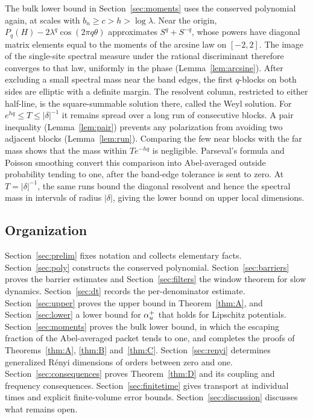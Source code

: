 The bulk lower bound in Section~\ref{sec:moments} uses the conserved polynomial again, at scales with $b_n\ge c>h>\log\lambda$. Near the origin, $P_q(H)-2\lambda^q\cos(2\pi q\theta)$ approximates $S^q+S^{-q}$, whose powers have diagonal matrix elements equal to the moments of the arcsine law on $[-2,2]$. The image of the single-site spectral measure under the rational discriminant therefore converges to that law, uniformly in the phase (Lemma~\ref{lem:arcsine}). After excluding a small spectral mass near the band edges, the first $q$-blocks on both sides are elliptic with a definite margin. The resolvent column, restricted to either half-line, is the square-summable solution there, called the Weyl solution. For $e^{hq}\le T\le|\delta|^{-1}$ it remains spread over a long run of consecutive blocks. A pair inequality (Lemma~\ref{lem:pair}) prevents any polarization from avoiding two adjacent blocks (Lemma~\ref{lem:run}). Comparing the few near blocks with the far mass shows that the mass within $Te^{-hq}$ is negligible. Parseval's formula and Poisson smoothing convert this comparison into Abel-averaged outside probability tending to one, after the band-edge tolerance is sent to zero. At $T=|\delta|^{-1}$, the same runs bound the diagonal resolvent and hence the spectral mass in intervals of radius $|\delta|$, giving the lower bound on upper local dimensions.

\subsection{Organization}

Section~\ref{sec:prelim} fixes notation and collects elementary facts. Section~\ref{sec:poly} constructs the conserved polynomial. Section~\ref{sec:barriers} proves the barrier estimates and Section~\ref{sec:filters} the window theorem for slow dynamics. Section~\ref{sec:dt} records the per-denominator estimate. Section~\ref{sec:upper} proves the upper bound in Theorem~\ref{thm:A}, and Section~\ref{sec:lower} a lower bound for $\alpha_u^+$ that holds for Lipschitz potentials. Section~\ref{sec:moments} proves the bulk lower bound, in which the escaping fraction of the Abel-averaged packet tends to one, and completes the proofs of Theorems~\ref{thm:A}, \ref{thm:B} and~\ref{thm:C}. Section~\ref{sec:renyi} determines generalized R\'enyi dimensions of orders between zero and one. Section~\ref{sec:consequences} proves Theorem~\ref{thm:D} and its coupling and frequency consequences. Section~\ref{sec:finitetime} gives transport at individual times and explicit finite-volume error bounds. Section~\ref{sec:discussion} discusses what remains open.
